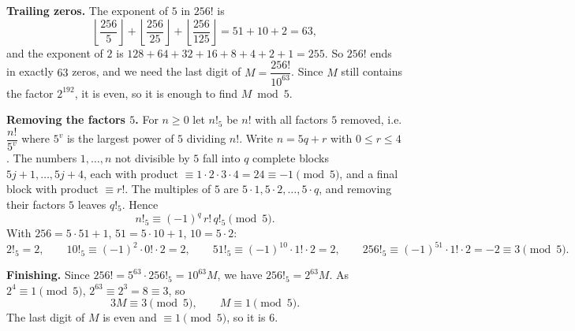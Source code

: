 \textbf{Trailing zeros.} The exponent of $5$ in $256!$ is
\[\left\lfloor\dfrac{256}{5}\right\rfloor+\left\lfloor\dfrac{256}{25}\right\rfloor+\left\lfloor\dfrac{256}{125}\right\rfloor=51+10+2=63,\]
and the exponent of $2$ is $128+64+32+16+8+4+2+1=255$. So $256!$ ends in exactly $63$ zeros, and we need the last digit of $M=\dfrac{256!}{10^{63}}$. Since $M$ still contains the factor $2^{192}$, it is even, so it is enough to find $M\bmod5$.

\textbf{Removing the factors $5$.} For $n\ge0$ let $n!_5$ be $n!$ with all factors $5$ removed, i.e. $\dfrac{n!}{5^v}$ where $5^v$ is the largest power of $5$ dividing $n!$. Write $n=5q+r$ with $0\le r\le4$. The numbers $1,\dots,n$ not divisible by $5$ fall into $q$ complete blocks $5j+1,\dots,5j+4$, each with product $\equiv1\cdot2\cdot3\cdot4=24\equiv-1\pmod5$, and a final block with product $\equiv r!$. The multiples of $5$ are $5\cdot1,5\cdot2,\dots,5\cdot q$, and removing their factors $5$ leaves $q!_5$. Hence
\[n!_5\equiv(-1)^q\,r!\,q!_5\pmod5.\]
With $256=5\cdot51+1$, $51=5\cdot10+1$, $10=5\cdot2$:
\[2!_5=2,\qquad10!_5\equiv(-1)^2\cdot0!\cdot2=2,\qquad51!_5\equiv(-1)^{10}\cdot1!\cdot2=2,\qquad256!_5\equiv(-1)^{51}\cdot1!\cdot2=-2\equiv3\pmod5.\]

\textbf{Finishing.} Since $256!=5^{63}\cdot256!_5=10^{63}M$, we have $256!_5=2^{63}M$. As $2^4\equiv1\pmod5$, $2^{63}\equiv2^3=8\equiv3$, so
\[3M\equiv3\pmod5,\qquad M\equiv1\pmod5.\]
The last digit of $M$ is even and $\equiv1\pmod5$, so it is $\boxed{6}$.
